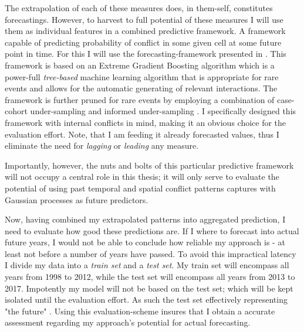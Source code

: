 \documentclass[a4paper]{article}
\begin{document}
The extrapolation of each of these measures does, in them-self, constitutes forecastings. However, to harvest to full potential of these measures I will use them as individual features in a combined predictive framework. A framework capable of predicting probability of conflict in some given cell at some future point in time. For this I will use the forecasting-framework presented in \cite{Maase}. This framework is based on an Extreme Gradient Boosting algorithm \citep{Chen_2016} which is a power-full \emph{tree-based} machine learning algorithm that is appropriate for rare events and allows for the automatic generating of relevant interactions. The framework is further pruned for rare events by employing a combination of case-cohort under-sampling \citep[142]{King_Zeng_2001} and informed under-sampling \cite[1267]{He_2008}. I specifically designed this framework with internal conflicts in mind, making it an obvious choice for the evaluation effort. Note, that I am feeding it already forecasted values, thus I eliminate the need for \emph{lagging} or \emph{leading} any measure.\par 

%
Importantly, however, the nuts and bolts of this particular predictive framework will not occupy a central role in this thesis; it will only serve to evaluate the potential of using past temporal and spatial conflict patterns captures with Gaussian processes as future predictors.\par



Now, having combined my extrapolated patterns into aggregated prediction, I need to evaluate how good these predictions are. If I where to forecast into actual future years, I would not be able to conclude how reliable my approach is - at least not before a number of years have passed. To avoid this impractical latency I divide my data into a \emph{train set} and a \emph{test set}. My train set will encompass all years from 1998 to 2012, while the test set will encompass all years from 2013 to 2017. Impotently my model will not be based on the test set; which will be kept isolated until the evaluation effort. As such the test set effectively representing "the future" \cite[199-200]{Goldstone_2010}. Using this evaluation-scheme insures that I obtain a accurate assessment regarding my approach's potential for actual forecasting.\par 
\end{document}
